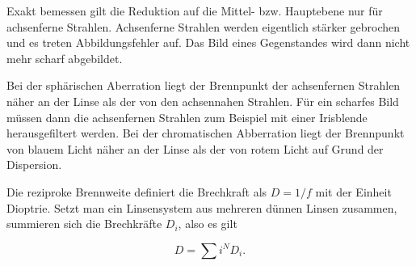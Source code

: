 Exakt bemessen gilt die Reduktion auf die Mittel- bzw. Hauptebene nur für achsenferne Strahlen. Achsenferne Strahlen werden eigentlich stärker gebrochen und es treten Abbildungsfehler auf. Das Bild eines Gegenstandes wird dann nicht mehr scharf abgebildet. 

Bei der sphärischen Aberration liegt der Brennpunkt der achsenfernen Strahlen näher an der Linse als der von den achsennahen Strahlen. Für ein scharfes Bild müssen dann die achsenfernen Strahlen zum Beispiel mit einer Irisblende herausgefiltert werden. Bei der chromatischen Abberration liegt der Brennpunkt von blauem Licht näher an der Linse als der von rotem Licht auf Grund der Dispersion. 

Die reziproke Brennweite definiert die Brechkraft als $D= 1/f$ mit der Einheit Dioptrie. Setzt man ein Linsensystem aus mehreren dünnen Linsen zusammen, summieren sich die Brechkräfte $D_i$, also es gilt 

\begin{equation}
    D= \sum{i}^N D_i.
    \label{eqn:brechungskraft}
\end{equation}


